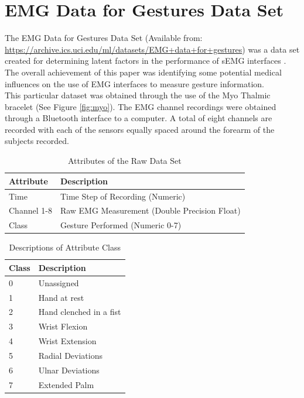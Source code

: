 \documentclass[11pt]{article}
\begin{document}
	\section{EMG Data for Gestures Data Set}
	The EMG Data for Gestures Data Set (Available from: \url{https://archive.ics.uci.edu/ml/datasets/EMG+data+for+gestures}) was a data set created for determining latent factors in the performance of sEMG interfaces \cite{Lobov2018}. The overall achievement of this paper was identifying some potential medical influences on the use of EMG interfaces to measure gesture information.\\
	
	\noindent
	This particular dataset was obtained through the use of the Myo Thalmic bracelet (See Figure \ref{fig:myo}). The EMG channel recordings were obtained through a Bluetooth interface to a computer. A total of eight channels are recorded with each of the sensors equally spaced around the forearm of the subjects recorded.\\
	
	\begin{table}[H]
		\caption{Attributes of the Raw Data Set}
		\centering
		\begin{tabular}{l|l}
			Attribute   & Description             \\\hline
			Time        & Time Step of  Recording (Numeric)\\
			Channel 1-8 & Raw EMG Measurement (Double Precision Float)     \\
			Class       & Gesture Performed (Numeric 0-7)      \\\hline\hline
		\end{tabular}
	\end{table}

\begin{table}[H]
	\caption{Descriptions of Attribute Class}
	\centering
	\begin{tabular}{l|l}
		Class & Description             \\\hline
		0     & Unassigned              \\
		1     & Hand at rest            \\
		2     & Hand clenched in a fist \\
		3     & Wrist Flexion           \\
		4     & Wrist Extension         \\
		5     & Radial Deviations       \\
		6     & Ulnar Deviations        \\
		7     & Extended Palm           \\\hline\hline
	\end{tabular}
\end{table}
	
\end{document}
